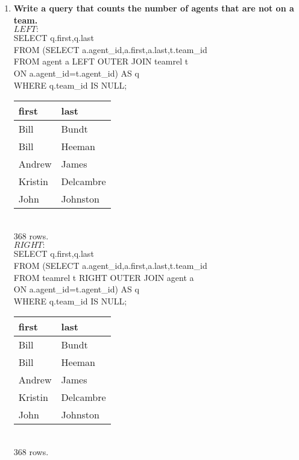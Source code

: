 \documentclass{article}
\begin{document}
\begin{enumerate}
\item
\textbf{Write a query that counts the number of agents that are not on a team.\\}
$LEFT:$\\
SELECT q.first,q.last\\
FROM (SELECT a.agent\_id,a.first,a.last,t.team\_id\\
\hspace*{1 cm}FROM agent a LEFT OUTER JOIN teamrel t\\
\hspace*{1 cm}ON a.agent\_id=t.agent\_id) AS q\\
\hspace*{5 cm}                          WHERE q.team\_id IS NULL;\\
\begin{tabular}{l|l}
first      &     last     \\
\hline
 Bill            & Bundt\\
 Bill            & Heeman\\
 Andrew          & James\\
 Kristin         & Delcambre\\
 John            & Johnston\\
\end{tabular}
\\368 rows.\\

$RIGHT:$\\
SELECT q.first,q.last\\
FROM (SELECT a.agent\_id,a.first,a.last,t.team\_id\\
\hspace*{1 cm}FROM teamrel t RIGHT OUTER JOIN agent a\\
\hspace*{1 cm}ON a.agent\_id=t.agent\_id) AS q\\
\hspace*{5 cm}                          WHERE q.team\_id IS NULL;\\
\begin{tabular}{l|l}
first      &     last     \\
\hline
 Bill            & Bundt\\
 Bill            & Heeman\\
 Andrew          & James\\
 Kristin         & Delcambre\\
 John            & Johnston\\
\end{tabular}
\\368 rows.\\


\end{enumerate}
\end{document}
